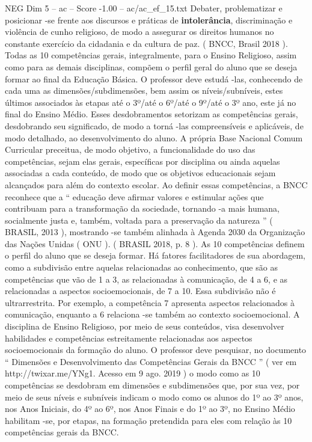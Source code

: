 \begin{textsample}{NEG Dim 5 – ac – Score -1.00 – ac/ac\_ef\_15.txt}
Debater, problematizar e posicionar -se frente aos discursos e práticas de \textbf{intolerância}, discriminação e violência de cunho religioso, de modo a assegurar os direitos humanos no constante exercício da cidadania e da cultura de paz. ( BNCC, Brasil 2018 ).
Todas as 10 competências gerais, integralmente, para o Ensino Religioso, assim como para as demais disciplinas, compõem o perfil geral do aluno que se deseja formar ao final da Educação Básica.
O professor deve estudá -las, conhecendo de cada uma as dimensões/subdimensões, bem assim os níveis/subníveis, estes últimos associados às etapas até o 3º/até o 6º/até o 9º/até o 3º ano, este já no final do Ensino Médio.
Esses desdobramentos setorizam as competências gerais, desdobrando seu significado, de modo a torná -las compreensíveis e aplicáveis, de modo detalhado, ao desenvolvimento do aluno.
A própria Base Nacional Comum Curricular preceitua, de modo objetivo, a funcionalidade do uso das competências, sejam elas gerais, específicas por disciplina ou ainda aquelas associadas a cada conteúdo, de modo que os objetivos educacionais sejam alcançados para além do contexto escolar.
Ao definir essas competências, a BNCC reconhece que a “ educação deve afirmar valores e estimular ações que contribuam para a transformação da sociedade, tornando -a mais humana, socialmente justa e, também, voltada para a preservação da natureza ” ( BRASIL, 2013 ), mostrando -se também alinhada à Agenda 2030 da Organização das Nações Unidas ( ONU ). ( BRASIL 2018, p. 8 ).
As 10 competências definem o perfil do aluno que se deseja formar.
Há fatores facilitadores de sua abordagem, como a subdivisão entre aquelas relacionadas ao conhecimento, que são as competências que vão de 1 a 3, as relacionadas à comunicação, de 4 a 6, e as relacionadas a aspectos socioemocionais, de 7 a 10.
Essa subdivisão não é ultrarrestrita.
Por exemplo, a competência 7 apresenta aspectos relacionados à comunicação, enquanto a 6 relaciona -se também ao contexto socioemocional.
A disciplina de Ensino Religioso, por meio de seus conteúdos, visa desenvolver habilidades e competências estreitamente relacionadas aos aspectos socioemocionais da formação do aluno.
O professor deve pesquisar, no documento “ Dimensões e Desenvolvimento das Competências Gerais da BNCC ” ( ver em http://twixar.me/YNg1.
Acesso em 9 ago. 2019 ) o modo como as 10 competências se desdobram em dimensões e subdimensões que, por sua vez, por meio de seus níveis e subníveis indicam o modo como os alunos do 1º ao 3º anos, nos Anos Iniciais, do 4º ao 6º, nos Anos Finais e do 1º ao 3º, no Ensino Médio habilitam -se, por etapas, na formação pretendida para eles com relação às 10 competências gerais da BNCC.

\end{textsample}
